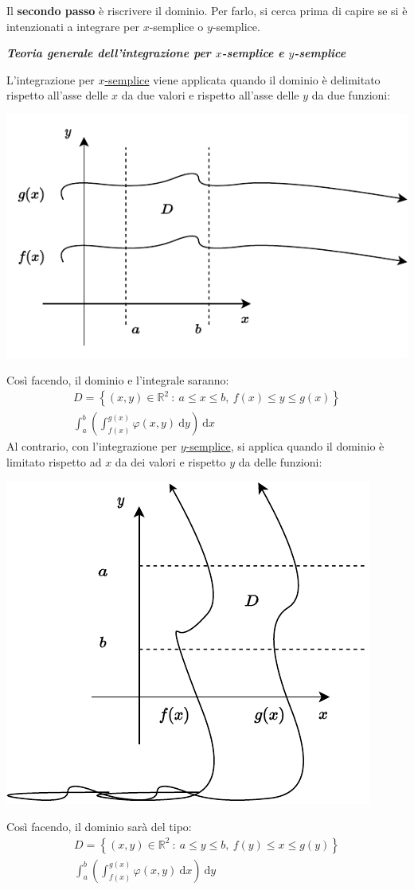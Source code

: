 \documentclass[a4paper]{article}
\begin{document}
	\noindent
	Il \textbf{secondo passo} è riscrivere il dominio. Per farlo, si cerca prima di capire se si è intenzionati a integrare per $x$-semplice o $y$-semplice.
	\begin{mdframed}
		\textbf{\emph{Teoria generale dell'integrazione per $x$-semplice e $y$-semplice}}\newline

		\noindent
		L'integrazione per \underline{$x$-semplice} viene applicata quando il dominio è delimitato rispetto all'asse delle $x$ da due valori e rispetto all'asse delle $y$ da due funzioni:
		\begin{center}
			\includegraphics[width=.35\textwidth]{img/grafico-ex6-6.pdf}
		\end{center}
		Così facendo, il dominio e l'integrale saranno:
		\begin{gather*}
			D = \left\{\left(x,y\right) \in \mathbb{R}^{2} \: : \: a \le x \le b, \: f\left(x\right) \le y \le g\left(x\right)\right\} \\
			\int_{a}^{b} \left(\int_{f\left(x\right)}^{g\left(x\right)} \varphi\left(x,y\right) \: \mathrm{d}y\right) \: \mathrm{d}x
		\end{gather*}
		Al contrario, con l'integrazione per \underline{$y$-semplice}, si applica quando il dominio è limitato rispetto ad $x$ da dei valori e rispetto $y$ da delle funzioni:
		\begin{center}
			\includegraphics[width=.35\textwidth]{img/grafico-ex6-7.pdf}
		\end{center}
		Così facendo, il dominio sarà del tipo:
		\begin{gather*}
			D = \left\{\left(x,y\right) \in \mathbb{R}^{2} \: : \: a \le y \le b, \: f\left(y\right) \le x \le g\left(y\right)\right\} \\
			\int_{a}^{b} \left(\int_{f\left(x\right)}^{g\left(x\right)} \varphi\left(x,y\right) \: \mathrm{d}x\right) \: \mathrm{d}y

\end{gather*}
\end{mdframed}
\end{document}
